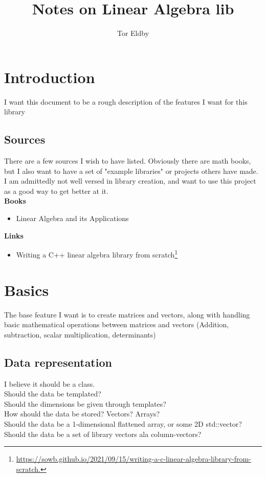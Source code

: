 \documentclass[a4]{article}
\title{Notes on Linear Algebra lib}
\author{Tor Eldby}
\title{}
\begin{document}
\maketitle

\section{Introduction}
I want this document to be a rough description of the features I want for this library

\subsection{Sources}
There are a few sources I wish to have listed. Obviously there are math books, but I also want to have a set of "example libraries" or projects others have made. I am admittedly not well versed in library creation, and want to use this project as a good way to get better at it.\\
\textbf{Books}
\begin{itemize}
\item Linear Algebra and its Applications
\end{itemize}

\textbf{Links}
\begin{itemize}
\item Writing a C++ linear algebra library from scratch\footnote{\url{https://sowb.github.io/2021/09/15/writing-a-c-linear-algebra-library-from-scratch.}}
\end{itemize}

\section{Basics}
The base feature I want is to create matrices and vectors, along with handling basic mathematical operations between matrices and vectors (Addition, subtraction, scalar multiplication, determinants)

\subsection{Data representation}
I believe it should be a class. \\
Should the data be templated? \\
Should the dimensions be given through templates? \\
How should the data be stored? Vectors? Arrays? \\
Should the data be a 1-dimensional flattened array, or some 2D std::vector?\\ 
Should the data be a set of library vectors ala column-vectors?
\end{document}
